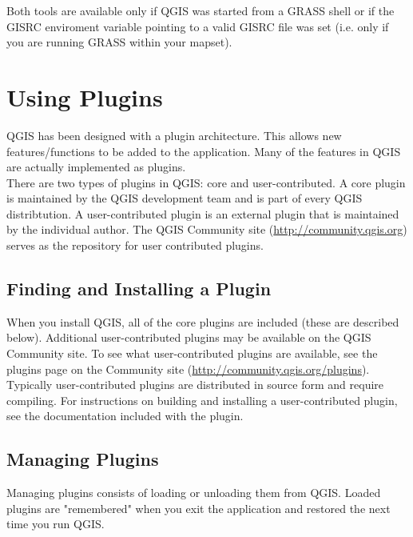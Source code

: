 \documentclass[10pt,english]{article}
\begin{document}
\begin{onehalfspace}
Both tools are available only if QGIS was started from a GRASS 
shell or if the GISRC enviroment variable pointing to a
valid GISRC file was set (i.e. only if you are running 
GRASS within your mapset).


\section{Using Plugins}
QGIS has been designed with a plugin architecture. This allows new features/functions to be added to the application. Many of the features in QGIS are actually implemented as plugins.\\

There are two types of plugins in QGIS: core and user-contributed. A core plugin is maintained by the QGIS development team and is part of every QGIS distribtution. A user-contributed plugin is an external plugin that is maintained by the individual author. The QGIS Community site (\url{http://community.qgis.org}) serves as the repository for user contributed plugins.

\subsection{Finding and Installing a Plugin}
When you install QGIS, all of the core plugins are included (these are described below). Additional user-contributed plugins may be available on the QGIS Community site. To see what user-contributed plugins are available, see the plugins page on the Community site (\url{http://community.qgis.org/plugins}).\\

Typically user-contributed plugins are distributed in source form and require compiling. For instructions on building and installing a user-contributed plugin, see the documentation included with the plugin.
\subsection{Managing Plugins}\label{sec:managing_plugins}
Managing plugins consists of loading or unloading them from QGIS. Loaded plugins are "remembered" when you exit the application and restored the next time you run QGIS.\\


\end{onehalfspace}
\end{document}
